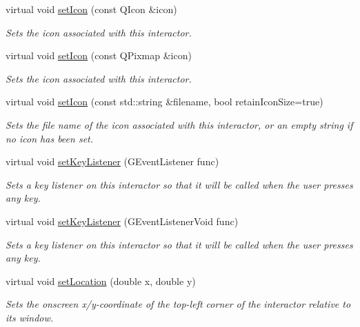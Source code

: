 \begin{DoxyCompactItemize}
virtual void \mbox{\hyperlink{classGInteractor_a542abfcd7261751352af129c7215ecda}{set\+Icon}} (const Q\+Icon \&icon)
\begin{DoxyCompactList}\small\item\em Sets the icon associated with this interactor. \end{DoxyCompactList}\item 
virtual void \mbox{\hyperlink{classGInteractor_a368e1a338f84401c284506d03b1ba769}{set\+Icon}} (const Q\+Pixmap \&icon)
\begin{DoxyCompactList}\small\item\em Sets the icon associated with this interactor. \end{DoxyCompactList}\item 
virtual void \mbox{\hyperlink{classGInteractor_a762e139aa311461c3984d3ad28293f64}{set\+Icon}} (const std\+::string \&filename, bool retain\+Icon\+Size=true)
\begin{DoxyCompactList}\small\item\em Sets the file name of the icon associated with this interactor, or an empty string if no icon has been set. \end{DoxyCompactList}\item 
virtual void \mbox{\hyperlink{classGInteractor_aeb8324d3287fa1fbe093f4d6230cf0a6}{set\+Key\+Listener}} (G\+Event\+Listener func)
\begin{DoxyCompactList}\small\item\em Sets a key listener on this interactor so that it will be called when the user presses any key. \end{DoxyCompactList}\item 
virtual void \mbox{\hyperlink{classGInteractor_ae48ecea73606c7bd9423e1c7cc589cc9}{set\+Key\+Listener}} (G\+Event\+Listener\+Void func)
\begin{DoxyCompactList}\small\item\em Sets a key listener on this interactor so that it will be called when the user presses any key. \end{DoxyCompactList}\item 
virtual void \mbox{\hyperlink{classGInteractor_a04594e8ba9b98513a64f1da00dcae18c}{set\+Location}} (double x, double y)
\begin{DoxyCompactList}\small\item\em Sets the onscreen x/y-\/coordinate of the top-\/left corner of the interactor relative to its window. \end{DoxyCompactList}\item 

\end{DoxyCompactItemize}
